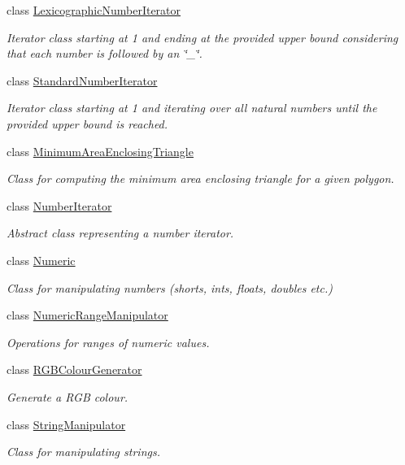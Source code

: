 \begin{DoxyCompactItemize}
class \hyperlink{classmultiscale_1_1LexicographicNumberIterator}{Lexicographic\-Number\-Iterator}
\begin{DoxyCompactList}\small\item\em Iterator class starting at 1 and ending at the provided upper bound considering that each number is followed by an \char`\"{}\-\_\-\char`\"{}. \end{DoxyCompactList}\item 
class \hyperlink{classmultiscale_1_1StandardNumberIterator}{Standard\-Number\-Iterator}
\begin{DoxyCompactList}\small\item\em Iterator class starting at 1 and iterating over all natural numbers until the provided upper bound is reached. \end{DoxyCompactList}\item 
class \hyperlink{classmultiscale_1_1MinimumAreaEnclosingTriangle}{Minimum\-Area\-Enclosing\-Triangle}
\begin{DoxyCompactList}\small\item\em Class for computing the minimum area enclosing triangle for a given polygon. \end{DoxyCompactList}\item 
class \hyperlink{classmultiscale_1_1NumberIterator}{Number\-Iterator}
\begin{DoxyCompactList}\small\item\em Abstract class representing a number iterator. \end{DoxyCompactList}\item 
class \hyperlink{classmultiscale_1_1Numeric}{Numeric}
\begin{DoxyCompactList}\small\item\em Class for manipulating numbers (shorts, ints, floats, doubles etc.) \end{DoxyCompactList}\item 
class \hyperlink{classmultiscale_1_1NumericRangeManipulator}{Numeric\-Range\-Manipulator}
\begin{DoxyCompactList}\small\item\em Operations for ranges of numeric values. \end{DoxyCompactList}\item 
class \hyperlink{classmultiscale_1_1RGBColourGenerator}{R\-G\-B\-Colour\-Generator}
\begin{DoxyCompactList}\small\item\em Generate a R\-G\-B colour. \end{DoxyCompactList}\item 
class \hyperlink{classmultiscale_1_1StringManipulator}{String\-Manipulator}
\begin{DoxyCompactList}\small\item\em Class for manipulating strings. \end{DoxyCompactList}\end{DoxyCompactItemize}

